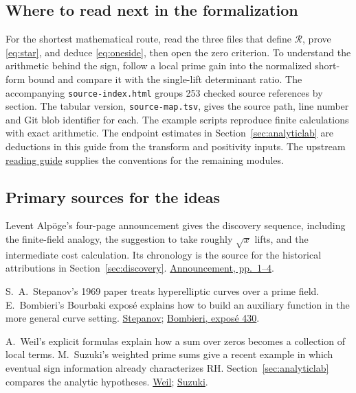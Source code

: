 \documentclass[11pt,letterpaper]{article}
\begin{document}
\subsection{Where to read next in the formalization}
For the shortest mathematical route, read the three files that define \(\mathcal R\), prove \eqref{eq:star}, and deduce \eqref{eq:oneside}, then open the zero criterion. To understand the arithmetic behind the sign, follow a local prime gain into the normalized short-form bound and compare it with the single-lift determinant ratio. The accompanying \texttt{source-index.html} groups 253 checked source references by section. The tabular version, \texttt{source-map.tsv}, gives the source path, line number and Git blob identifier for each. The example scripts reproduce finite calculations with exact arithmetic. The endpoint estimates in Section~\ref{sec:analyticlab} are deductions in this guide from the transform and positivity inputs. The upstream \href{https://github.com/lsernau/grh-lean/blob/72fead102f663d5c7a407964a13dc0cf9d977207/grh/GUIDE.md}{reading guide} supplies the conventions for the remaining modules.
\subsection{Primary sources for the ideas}

\begin{description}\setlength{\itemsep}{3pt}
\item[The original argument.] Levent Alpöge's four-page announcement gives the discovery sequence, including the finite-field analogy, the suggestion to take roughly \(\sqrt{x}\) lifts, and the intermediate cost calculation. Its chronology is the source for the historical attributions in Section~\ref{sec:discovery}. \href{https://alpo.ge/remark.pdf}{Announcement, pp.~1--4}.
\item[Finite-field multiplicity.] S.\ A.\ Stepanov's 1969 paper treats hyperelliptic curves over a prime field. E.\ Bombieri's Bourbaki exposé explains how to build an auxiliary function in the more general curve setting. \href{https://doi.org/10.1070/IM1969v003n05ABEH000834}{Stepanov}; \href{https://numdam.org/item/SB_1972-1973__15__234_0/}{Bombieri, exposé 430}.
\item[The earlier analytic criteria.] A.\ Weil's explicit formulas explain how a sum over zeros becomes a collection of local terms. M.\ Suzuki's weighted prime sums give a recent example in which eventual sign information already characterizes RH. Section~\ref{sec:analyticlab} compares the analytic hypotheses. \href{https://doi.org/10.1070/IM1972v006n01ABEH001866}{Weil}; \href{https://doi.org/10.1007/s11139-025-01238-9}{Suzuki}.
\end{description}
\end{document}
